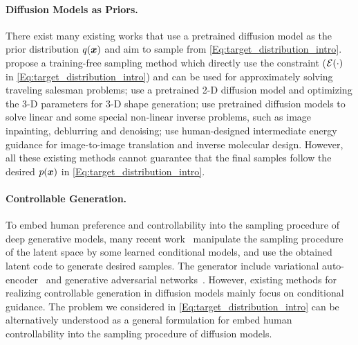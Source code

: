 \paragraph{Diffusion Models as Priors.}
There exist many existing works that use a pretrained diffusion model as the prior distribution $q({\bm{x}})$ and aim to sample from \eqref{Eq:target_distribution_intro}. \citet{graikos2022diffusion} propose a training-free sampling method which directly use the constraint (${\mathcal{E}}(\cdot)$ in \eqref{Eq:target_distribution_intro}) and can be used for approximately solving traveling salesman problems; \citet{poole2022dreamfusion} use a pretrained 2-D diffusion model and optimizing the 3-D parameters for 3-D shape generation; \citet{kawar2022denoising,chung2022diffusion} use pretrained diffusion models to solve linear and some special non-linear inverse problems, such as image inpainting, deblurring and denoising; \citet{zhao2022egsde,bao2022equivariant} use human-designed intermediate energy guidance for image-to-image translation and inverse molecular design. However, all these existing methods cannot guarantee that the final samples follow the desired $p({\bm{x}})$ in \eqref{Eq:target_distribution_intro}.


\paragraph{Controllable Generation.}
To embed human preference and controllability into the sampling procedure of deep generative models, many recent work~\citep{nie2021controllable,li2022diffusion,pandey2022diffusevae} manipulate the sampling procedure of the latent space by some learned conditional models, and use the obtained latent code to generate desired samples. The generator include variational auto-encoder~\citep{kingma2013auto} and generative adversarial networks~\citep{goodfellow2020generative}. However, existing methods for realizing controllable generation in diffusion models mainly focus on conditional guidance. The problem we considered in \eqref{Eq:target_distribution_intro} can be alternatively understood as a general formulation for embed human controllability into the sampling procedure of diffusion models.

